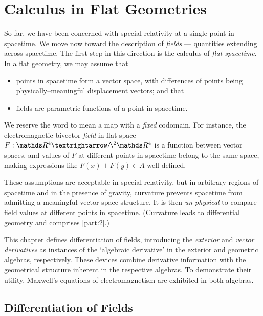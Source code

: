 \chapter{Calculus in Flat Geometries}

So far, we have been concerned with special relativity at a single point in spacetime.
We move now toward the description of \emph{fields} --- quantities extending across spacetime.
The first step in this direction is the calculus of \emph{flat spacetime}.
In a flat geometry, we may assume that
\begin{itemize}
	\item points in spacetime form a vector space, with differences of points being physically--meaningful displacement vectors; and that
	\item fields are parametric functions of a point in spacetime.
\end{itemize}
We reserve the word  to mean a map with a \emph{fixed} codomain.
For instance, the electromagnetic bivector \emph{field} in flat space $F : \RR^4 → \EA[2]{\RR^4}$ is a function between vector spaces, and values of $F$ at different points in spacetime belong to the same space, making expressions like $F(x) + F(y) ∈ A$ well-defined.

These assumptions are acceptable in special relativity, but in arbitrary regions of spacetime and in the presence of gravity, curvature prevents spacetime from admitting a meaningful vector space structure.
It is then \emph{un-physical} to compare field values at different points in spacetime.
(Curvature leads to differential geometry and comprises \cref{part:2}.)

This chapter defines differentiation of fields, introducing the \emph{exterior} and \emph{vector derivatives} as instances of the `algebraic derivative' in the exterior and geometric algebras, respectively.
These devices combine derivative information with the geometrical structure inherent in the respective algebras.
To demonstrate their utility, Maxwell's equations of electromagnetism are exhibited in both algebras.


\section{Differentiation of Fields}
\label{sec:algder}

